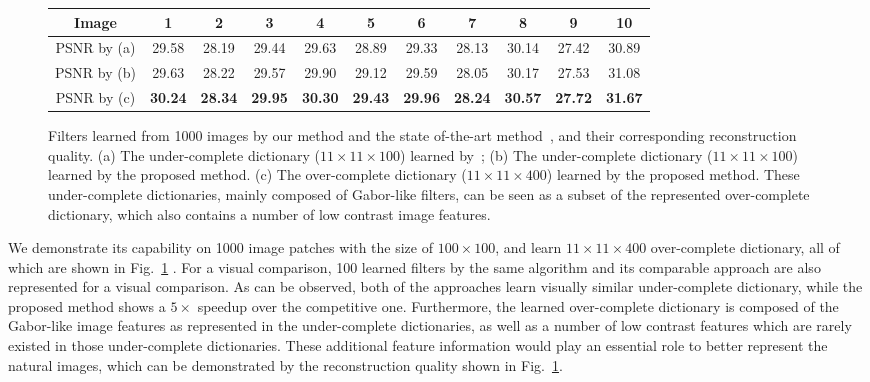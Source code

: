 \begin{figure}[h]
{\begin{tabular}{|c||c|c|c|c|c|c|c|c|c|c|}
            Image & 1 & 2 & 3 & 4 & 5 & 6 & 7 & 8 & 9 & 10 \\
            \hline
            PSNR by (a) & 29.58 & 28.19 & 29.44 & 29.63 & 28.89 & 29.33 & 28.13  & 30.14 & 27.42 & 30.89 \\
            \hline
            PSNR by (b) & 29.63 & 28.22 & 29.57 & 29.90 & 29.12 & 29.59 & 28.05  & 30.17 & 27.53 & 31.08 \\
            \hline
            PSNR by (c) & \textbf{30.24} & \textbf{28.34} & \textbf{29.95}  & \textbf{30.30} & \textbf{29.43} & \textbf{29.96} & \textbf{28.24} & \textbf{30.57} & \textbf{27.72} & \textbf{31.67} \\
            \hline
        \end{tabular} }

\caption{Filters learned from 1000 images by our method and the state of-the-art method~\cite{liu-2018-first}, and their corresponding reconstruction quality. (a) The under-complete dictionary ($11 \times 11 \times 100$) learned by~\cite{liu-2018-first}; (b) The under-complete dictionary ($11 \times 11 \times 100$) learned by the proposed method. (c) The over-complete dictionary ($11 \times 11 \times 400$) learned by the proposed method. These under-complete dictionaries, mainly composed of Gabor-like filters, can be seen as a subset of the represented over-complete dictionary, which also contains a number of low contrast image features.
}
\label{fig:overCompleteDic}
\end{figure}

We demonstrate its capability on 1000 image patches with the size of $100 \times 100$, and learn $11 \times 11 \times 400$ over-complete dictionary, all of which are shown in Fig.~\ref{fig:overCompleteDic} . For a visual comparison, 100 learned filters by the same algorithm and its comparable approach are also represented for a visual comparison. As can be observed, both of the approaches learn visually similar under-complete dictionary, while the proposed method shows a $5 \times$ speedup over the competitive one. Furthermore, the learned over-complete dictionary is composed of the Gabor-like image features as represented in the under-complete dictionaries, as well as a number of low contrast features which are rarely existed in those under-complete dictionaries. These additional feature information would play an essential role to better represent the natural images, which can be demonstrated by the reconstruction quality shown in Fig.~\ref{fig:overCompleteDic}.

